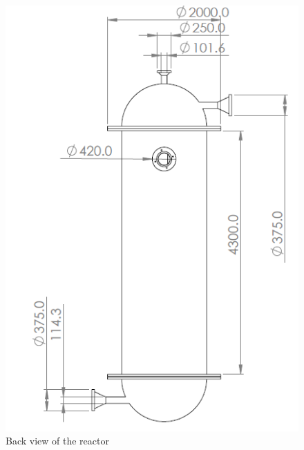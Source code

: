 \begin{figure}[h]
\begin{minipage}[t]{0.49\linewidth}
        \includegraphics[width=\linewidth]{chapters/2-reaction/figures/FYD reactor left view with calc.PNG}
        \caption{Back view of the reactor}
        \label{fig:reactorleft}
    \end{minipage}
\end{figure}

\begin{figure}
    \centering

\end{figure}

